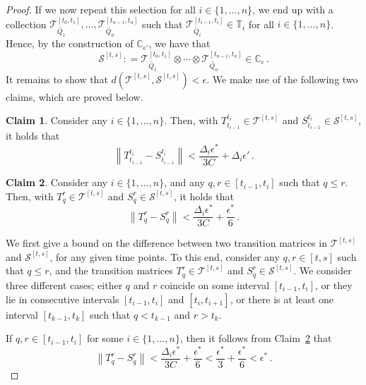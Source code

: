 \documentclass[10pt]{paper}
\theoremstyle{definition}
\newtheorem{claim}{Claim}[theorem]
\newcommand{\norm}[1]{\left\lVert #1 \right\rVert}
\newcommand{\coloneqq}{:\!=}
\begin{document}
\begin{proof}
If we now repeat this selection for all $i\in\{1,\ldots,n\}$, we end up with a collection $\mathcal{T}_{\widetilde{Q_1}}^{[t_{0},t_1]},\ldots,\mathcal{T}_{\widetilde{Q_n}}^{[t_{n-1},t_n]}$ such that $\mathcal{T}_{\widetilde{Q_i}}^{[t_{i-1},t_i]}\in \mathbb{T}_i$ for all $i\in\{1,\ldots,n\}$. Hence, by the construction of $\mathbb{C}_{\epsilon'}$, we have that
\begin{equation*}
\mathcal{S}^{[t,s]}\coloneqq \mathcal{T}_{\widetilde{Q_1}}^{[t_{0},t_1]} \otimes \cdots \otimes \mathcal{T}_{\widetilde{Q_n}}^{[t_{n-1},t_n]} \in \mathbb{C}_\epsilon\,.
\end{equation*}
It remains to show that $d(\mathcal{T}^{[t,s]},\mathcal{S}^{[t,s]})<\epsilon$. We make use of the following two claims, which are proved below.
\begin{claim}\label{claim:lemma_total_bounded_full_interval_error}
Consider any $i\in\{1,\ldots,n\}$. Then, with $T_{t_{i-1}}^{t_i}\in\mathcal{T}^{[t,s]}$ and $S_{t_{i-1}}^{t_i}\in\mathcal{S}^{[t,s]}$, it holds that
\begin{equation*}
\norm{T_{t_{i-1}}^{t_i} - S_{t_{i-1}}^{t_i}} < \frac{\Delta_i\epsilon^*}{3C} + \Delta_i\epsilon'\,.
\end{equation*}
\end{claim}
\begin{claim}\label{claim:lemma_total_bounded_sub_interval_error}
Consider any $i\in\{1,\ldots,n\}$, and any $q,r\in[t_{i-1},t_i]$ such that $q\leq r$. Then, with $T_q^r\in\mathcal{T}^{[t,s]}$ and $S_q^r\in\mathcal{S}^{[t,s]}$, it holds that
\begin{equation*}
\norm{T_q^r - S_q^r} < \frac{\Delta_i\epsilon^*}{3C} + \frac{\epsilon^*}{6}\,.
\end{equation*}
\end{claim}

We first give a bound on the difference between two transition matrices in $\mathcal{T}^{[t,s]}$ and $\mathcal{S}^{[t,s]}$, for any given time points. To this end, consider any $q,r\in[t,s]$ such that $q\leq r$, and the transition matrices $T_q^r\in\mathcal{T}^{[t,s]}$ and $S_q^r\in\mathcal{S}^{[t,s]}$. We consider three different cases; either $q$ and $r$ coincide on some interval $[t_{i-1},t_i]$, or they lie in consecutive intervals $[t_{i-1},t_i]$ and $[t_i,t_{i+1}]$, or there is at least one interval $[t_{k-1},t_k]$ such that $q<t_{k-1}$ and $r>t_k$. 

If $q,r\in[t_{i-1},t_i]$ for some $i\in\{1,\ldots,n\}$, then it follows from Claim~\ref{claim:lemma_total_bounded_sub_interval_error} that
\begin{equation*}
\norm{T_q^r - S_q^r} < \frac{\Delta_i\epsilon^*}{3C} + \frac{\epsilon^*}{6} < \frac{\epsilon^*}{3} + \frac{\epsilon^*}{6} < \epsilon^*\,.
\end{equation*}


\end{proof}
\end{document}
